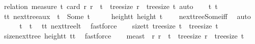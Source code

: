 \begin{isabellebody}
%
\isadelimproof
%
\endisadelimproof
%
\isatagproof
{}\isamarkupfalse%
\ {\isacharparenleft}{\kern0pt}relation\ {\isachardoublequoteopen}measure\ {\isacharparenleft}{\kern0pt}{\isasymlambda}t{\isachardot}{\kern0pt}\ card\ {\isacharbraceleft}{\kern0pt}r{\isachardot}{\kern0pt}\ r\ {\isacharless}{\kern0pt}\ t\ {\isasymand}\ tree{\isacharunderscore}{\kern0pt}size\ r\ {\isacharequal}{\kern0pt}\ tree{\isacharunderscore}{\kern0pt}size\ t{\isacharbraceright}{\kern0pt}{\isacharparenright}{\kern0pt}{\isachardoublequoteclose}{\isacharcomma}{\kern0pt}\ auto{\isacharparenright}{\kern0pt}\isanewline
\ \ \isamarkupfalse%
\ t\ t{\isacharprime}{\kern0pt}\ \isamarkupfalse%
\ t{\isacharunderscore}{\kern0pt}t{\isacharprime}{\kern0pt}{\isacharcolon}{\kern0pt}\ {\isachardoublequoteopen}next{\isacharunderscore}{\kern0pt}tree{\isacharunderscore}{\kern0pt}aux\ {}\ t\ {\isacharequal}{\kern0pt}\ Some\ t{\isacharprime}{\kern0pt}{\isachardoublequoteclose}\isanewline
\ \ \isamarkupfalse%
\ \isamarkupfalse%
\ height{\isacharunderscore}{\kern0pt}t{\isacharcolon}{\kern0pt}\ {\isachardoublequoteopen}height\ t\ {\isasymge}\ {}{\isachardoublequoteclose}\ \isamarkupfalse%
\ next{\isacharunderscore}{\kern0pt}tree{\isacharunderscore}{\kern0pt}Some{\isacharunderscore}{\kern0pt}iff\ \isamarkupfalse%
\ auto\isanewline
\ \ \isamarkupfalse%
\ \isamarkupfalse%
\ {\isachardoublequoteopen}t{\isacharprime}{\kern0pt}\ {\isacharless}{\kern0pt}\ t{\isachardoublequoteclose}\ \isamarkupfalse%
\ t{\isacharunderscore}{\kern0pt}t{\isacharprime}{\kern0pt}\ next{\isacharunderscore}{\kern0pt}tree{\isacharunderscore}{\kern0pt}lt\ \isamarkupfalse%
\ fastforce\isanewline
\ \ \isamarkupfalse%
\ size{\isacharunderscore}{\kern0pt}t{\isacharprime}{\kern0pt}{\isacharunderscore}{\kern0pt}t{\isacharcolon}{\kern0pt}\ {\isachardoublequoteopen}tree{\isacharunderscore}{\kern0pt}size\ t{\isacharprime}{\kern0pt}\ {\isacharequal}{\kern0pt}\ tree{\isacharunderscore}{\kern0pt}size\ t{\isachardoublequoteclose}\ \isamarkupfalse%
\ size{\isacharunderscore}{\kern0pt}next{\isacharunderscore}{\kern0pt}tree\ height{\isacharunderscore}{\kern0pt}t\ t{\isacharunderscore}{\kern0pt}t{\isacharprime}{\kern0pt}\ \isamarkupfalse%
\ fastforce\isanewline
\ \ \isamarkupfalse%
\ {\isacharquery}{\kern0pt}meas{\isacharunderscore}{\kern0pt}t{\isacharprime}{\kern0pt}\ {\isacharequal}{\kern0pt}\ {\isachardoublequoteopen}{\isacharbraceleft}{\kern0pt}r{\isachardot}{\kern0pt}\ r\ {\isacharless}{\kern0pt}\ t{\isacharprime}{\kern0pt}\ {\isasymand}\ tree{\isacharunderscore}{\kern0pt}size\ r\ {\isacharequal}{\kern0pt}\ tree{\isacharunderscore}{\kern0pt}size\ t{\isacharprime}{\kern0pt}{\isacharbraceright}{\kern0pt}{\isachardoublequoteclose}\isanewline

\end{isabellebody}
